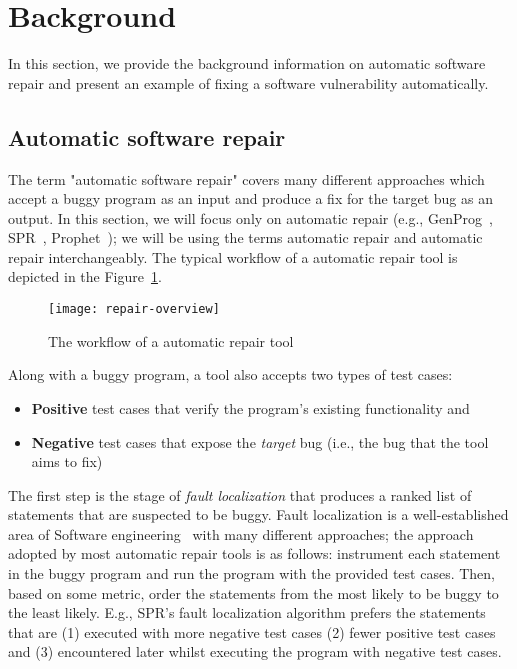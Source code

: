 \section{Background}
\label{section:background}

In this section, we provide the background information on automatic software repair and present an example of fixing a software vulnerability automatically.

\subsection{Automatic software repair}

The term "automatic software repair" covers many different approaches which accept a buggy program as an input and produce a fix for the target bug as an output.
In this section, we will focus only on \GV automatic repair (e.g., GenProg~\cite{le2012systematic}, SPR~\cite{long2015staged}, Prophet~\cite{long2015prophet}); we will be using the terms \GV automatic repair and automatic repair interchangeably.
The typical workflow of a \GV automatic repair tool is depicted in the Figure~\ref{figure:repair-overview}.

\begin{figure}
    \texttt{[image: repair-overview]}
    \caption{The workflow of a \GV automatic repair tool}
    \label{figure:repair-overview}
\end{figure}

Along with a buggy program, a \GV tool also accepts two types of test cases:
\begin{itemize}
    \item \textbf{Positive} test cases that verify the program's existing functionality and
    \item \textbf{Negative} test cases that expose the \emph{target} bug (i.e., the bug that the tool aims to fix)
\end{itemize}

The first step is the stage of \emph{fault localization} that produces a ranked list of statements that are suspected to be buggy. Fault localization is a well-established area of Software engineering~\cite{wong2009survey} with many different approaches; the approach adopted by most automatic repair tools is as follows: instrument each statement in the buggy program and run the program with the provided test cases. Then, based on some metric, order the statements from the most likely to be buggy to the least likely. E.g., SPR's fault localization algorithm prefers the statements that are (1) executed with more negative test cases (2) fewer positive test cases and (3) encountered later whilst executing the program with negative test cases.

